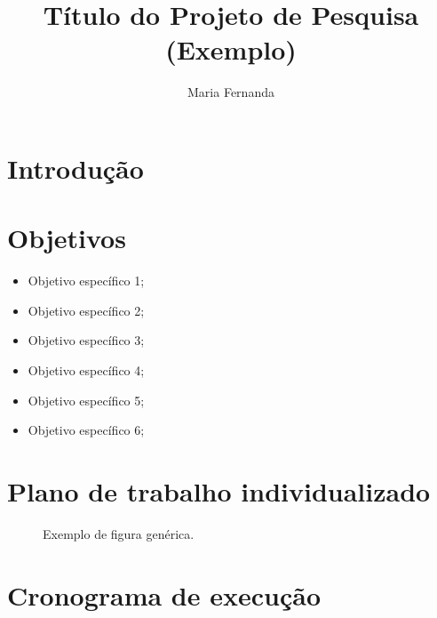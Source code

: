 \documentclass[12pt,consuni]{uftpibic}
\title{Título do Projeto de Pesquisa (Exemplo)}
\author{Maria Fernanda}{Souza}
\begin{document}
\maketitle

\vspace{1cm}
\setlength{\parindent}{1.5cm}
\chapter{Introdução}

\lipsum[1-2]

\vspace{1.5cm}
\chapter{Objetivos}

\lipsum[3]

\begin{itemize}
\item Objetivo específico 1;
\item Objetivo específico 2;
\item Objetivo específico 3;
\item Objetivo específico 4;
\item Objetivo específico 5;
\item Objetivo específico 6;
\end{itemize}


\vspace{1.5cm}
\chapter{Plano de trabalho individualizado}

\lipsum[4-5]

\begin{figure}[!htpb]
    \centering
    \caption{Exemplo de figura genérica.}
    \label{fig:exemplo1}
\end{figure}

\lipsum[6]

\vspace{1.5cm}
\chapter{Cronograma de execução}
\end{document}
